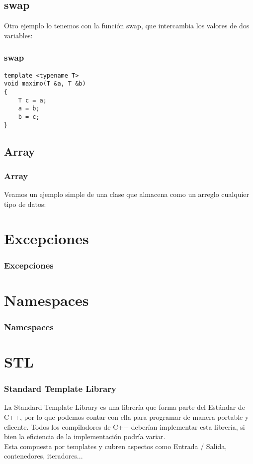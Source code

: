 \documentclass{beamer}
\begin{document}
\subsection{swap}
\begin{frame}[fragile]
Otro ejemplo lo tenemos con la función swap, que intercambia los valores de dos variables:
\frametitle{swap}
\begin{verbatim}
template <typename T>
void maximo(T &a, T &b)
{
    T c = a;
    a = b;
    b = c;
}
\end{verbatim}
\end{frame}

\subsection{Array}
\begin{frame}
\frametitle{Array}
Veamos un ejemplo simple de una clase que almacena como un arreglo cualquier tipo de datos:

\end{frame}

\section{Excepciones}
\begin{frame}
\frametitle{Excepciones}

\end{frame}

\section{Namespaces}
\begin{frame}
\frametitle{Namespaces}

\end{frame}

\section{STL}
\begin{frame}
\frametitle{Standard Template Library}

La Standard Template Library es una librería que forma parte del Estándar de C++, por lo que podemos contar con ella para programar de manera portable y eficente.
Todos los compiladores de C++ deberían implementar esta librería, si bien la eficiencia de la implementación podría variar. \\

Esta compuesta por templates y cubren aspectos como Entrada / Salida, contenedores, iteradores...
\end{frame}
\end{document}
